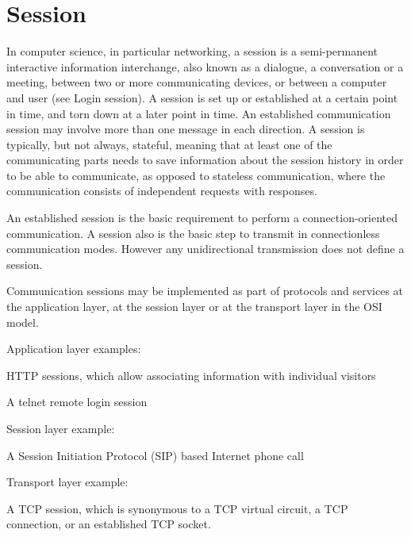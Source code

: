 \part{Session}

In computer science, in particular networking, a session\cite{session} is a semi-permanent interactive information interchange, also known as a dialogue, a conversation or a meeting, between two or more communicating devices, or between a computer and user (see Login session). A session is set up or established at a certain point in time, and torn down at a later point in time. An established communication session may involve more than one message in each direction. A session is typically, but not always, stateful, meaning that at least one of the communicating parts needs to save information about the session history in order to be able to communicate, as opposed to stateless communication, where the communication consists of independent requests with responses.

An established session is the basic requirement to perform a connection-oriented communication. A session also is the basic step to transmit in connectionless communication modes. However any unidirectional transmission does not define a session.

Communication sessions may be implemented as part of protocols and services at the application layer, at the session layer or at the transport layer in the OSI model.

\begin{compactitem}
\item Application layer examples:

	\begin{compactitem}
	\item HTTP sessions, which allow associating information with individual visitors
	\item A telnet remote login session
	\end{compactitem}

\item Session layer example:

	\begin{compactitem}
	\item A Session Initiation Protocol (SIP) based Internet phone call
	\end{compactitem}

\item Transport layer example:
	\begin{compactitem}
	\item A TCP session, which is synonymous to a TCP virtual circuit, a TCP connection, or an established TCP socket.
	\end{compactitem}

\end{compactitem}


